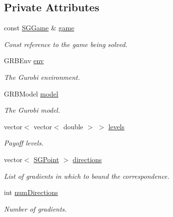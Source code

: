 \subsection*{Private Attributes}
\begin{DoxyCompactItemize}
\item 
\mbox{\label{classSGSolver__JYC_a35672b0735a0caa0c7e1ed250b2a14af}} 
const \hyperlink{classSGGame}{S\+G\+Game} \& \hyperlink{classSGSolver__JYC_a35672b0735a0caa0c7e1ed250b2a14af}{game}
\begin{DoxyCompactList}\small\item\em Const reference to the game being solved. \end{DoxyCompactList}\item 
\mbox{\label{classSGSolver__JYC_a9649e2498ddf9f00cfc0f8421fae3d2c}} 
G\+R\+B\+Env \hyperlink{classSGSolver__JYC_a9649e2498ddf9f00cfc0f8421fae3d2c}{env}
\begin{DoxyCompactList}\small\item\em The Gurobi environment. \end{DoxyCompactList}\item 
\mbox{\label{classSGSolver__JYC_a87b0a617d1a3ca7b7fdfab12fde0b64f}} 
G\+R\+B\+Model \hyperlink{classSGSolver__JYC_a87b0a617d1a3ca7b7fdfab12fde0b64f}{model}
\begin{DoxyCompactList}\small\item\em The Gurobi model. \end{DoxyCompactList}\item 
\mbox{\label{classSGSolver__JYC_abe4e58873ded1889eed4d704d5dd893d}} 
vector$<$ vector$<$ double $>$ $>$ \hyperlink{classSGSolver__JYC_abe4e58873ded1889eed4d704d5dd893d}{levels}
\begin{DoxyCompactList}\small\item\em Payoff levels. \end{DoxyCompactList}\item 
\mbox{\label{classSGSolver__JYC_a8eaf232eb1cc90b38e583892ed8832e6}} 
vector$<$ \hyperlink{classSGPoint}{S\+G\+Point} $>$ \hyperlink{classSGSolver__JYC_a8eaf232eb1cc90b38e583892ed8832e6}{directions}
\begin{DoxyCompactList}\small\item\em List of gradients in which to bound the correspondence. \end{DoxyCompactList}\item 
\mbox{\label{classSGSolver__JYC_a76cc905a4d426dba288a6d3dea632fb9}} 
int \hyperlink{classSGSolver__JYC_a76cc905a4d426dba288a6d3dea632fb9}{num\+Directions}
\begin{DoxyCompactList}\small\item\em Number of gradients. \end{DoxyCompactList}\end{DoxyCompactItemize}


